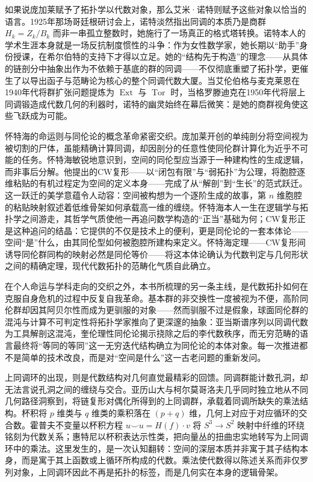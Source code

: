 \documentclass[12pt,a4paper]{article}
\begin{document}
如果说庞加莱赋予了拓扑学以代数对象，那么艾米·诺特则赋予这些对象以恰当的语言。1925年那场哥廷根研讨会上，诺特淡然指出同调的本质乃是商群 $H_k = Z_k/B_k$ 而非一串孤立整数时，她施行了一场真正的格式塔转换。诺特本人的学术生涯本身就是一场反抗制度惯性的斗争：作为女性数学家，她长期以“助手”身份授课，在希尔伯特的支持下才得以立足。她的“结构先于构造”的理念——从具体的链剖分中抽象出作为不依赖于基底的群的同调——不仅彻底重塑了拓扑学，更催生了以导出函子与范畴论为核心的整个同调代数大厦。当艾伦伯格与麦克莱恩在1940年代将群扩张问题提炼为 $\operatorname{Ext}$ 与 $\operatorname{Tor}$ 时，当格罗滕迪克在1950年代将层上同调锻造成代数几何的利器时，诺特的幽灵始终在幕后微笑：是她的商群视角使这些飞跃成为可能。

怀特海的命运则与同伦论的概念革命紧密交织。庞加莱开创的单纯剖分将空间视为被切割的尸体，虽能精确计算同调，却因剖分的任意性使同伦群计算化为近乎不可能的任务。怀特海敏锐地意识到，空间的同伦型应当源于一种建构性的生成逻辑，而非事后分解。他提出的CW复形——以“闭包有限”与“弱拓扑”为公理，将胞腔逐维粘贴的有机过程定为空间的定义本身——完成了从“解剖”到“生长”的范式跃迁。这一跃迁的美学意蕴令人动容：空间被构想为一个逐阶生成的故事，第 $n$ 维胞腔的粘贴映射叙述着低维骨架如何承载高一维的缠绕。怀特海本人一生在逻辑学与拓扑学之间游走，其哲学气质使他一再追问数学构造的“正当”基础为何；CW复形正是这种追问的结晶：它提供的不仅是技术上的便利，更是同伦论的一套本体论——空间“是”什么，由其同伦型如何被胞腔所建构来定义。怀特海定理——CW复形间诱导同伦群同构的映射必然是同伦等价——将这本体论确认为代数判定与几何形状之间的精确定理，现代代数拓扑的范畴化气质自此确立。

在个人命运与学科走向的交织之外，本书所梳理的另一条主线，是代数拓扑如何在克服自身危机的过程中反复自我革命。基本群的非交换性一度被视为不便，高阶同伦群却因其阿贝尔性而成为更驯服的对象——然而驯服不过是假象，球面同伦群的混沌与计算不可判定性将拓扑学家推向了更深邃的抽象：亚当斯谱序列以同调代数为工具解剖这混沌，奎伦理性同伦论揭示挠除之后的李代数秩序，而无穷范畴的语言最终将“等同的等同”这一无穷迭代结构确立为同伦论的本体对象。每一次推进都不是简单的技术改良，而是对“空间是什么”这一古老问题的重新发问。

上同调环的出现，则是代数结构对几何直觉最精彩的回馈。同调群能计数孔洞，却无法言说孔洞之间的缠绕与交合。亚历山大与柯尔莫哥洛夫几乎同时独立地从不同几何路径洞察到，将链复形对偶化所得到的上同调群，承载着同调所缺失的乘法结构。杯积将 $p$ 维类与 $q$ 维类的乘积落在 $(p+q)$ 维，几何上对应于对应循环的交合数。霍普夫不变量以杯积方程 $u\smile u = H(f)\cdot v$ 将 $S^3\to S^2$ 映射中纤维的环绕铭刻为代数关系；惠特尼以杯积表达示性类，把向量丛的扭曲忠实地转写为上同调环中的乘法。这里发生的，是一次认知翻转：空间的深层本质并非寓于其子结构本身，而是寓于其上函数或上循环所构成的代数。乘法使代数得以陈述关系而非仅罗列对象，上同调环因此不再是拓扑的标签，而是几何实在本身的逻辑骨架。
\end{document}
